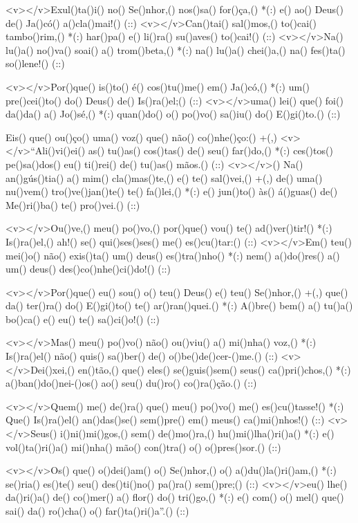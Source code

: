 <v></v>Exul()ta()i() no() Se()nhor,() nos()sa() for()ça,() *(:)
e() ao() Deus() de() Ja()có() a()cla()mai!() (::)
<v></v>Can()tai() sal()mos,() to()cai() tambo()rim,() *(:)
har()pa() e() li()ra() su()aves() to()cai!() (::)
<v></v>Na() lu()a() no()va() soai() a() trom()beta,() *(:)
na() lu()a() chei()a,() na() fes()ta() so()lene!() (::)

<v></v>Por()que() is()to() é() cos()tu()me() em() Ja()có,() *(:)
um() pre()cei()to() do() Deus() de() Is()ra()el;() (::)
<v></v>uma() lei() que() foi() da()da() a() Jo()sé,() *(:)
quan()do() o() po()vo() sa()iu() do() E()gi()to.() (::)

Eis() que() ou()ço() uma() voz() que() não() co()nhe()ço:() +(,)
<v></v>``Ali()vi()ei() as() tu()as() cos()tas() de() seu() far()do,() *(:)
ces()tos() pe()sa()dos() eu() ti()rei() de() tu()as() mãos.() (::)
<v></v>() Na() an()gús()tia() a() mim() cla()mas()te,() e() te() sal()vei,() +(,)
de() uma() nu()vem() tro()ve()jan()te() te() fa()lei,() *(:)
e() jun()to() às() á()guas() de() Me()ri()ba() te() pro()vei.() (::)

<v></v>Ou()ve,() meu() po()vo,() por()que() vou() te() ad()ver()tir!() *(:)
Is()ra()el,() ah!() se() qui()ses()ses() me() es()cu()tar:() (::)
<v></v>Em() teu() mei()o() não() exis()ta() um() deus() es()tra()nho() *(:)
nem() a()do()res() a() um() deus() des()co()nhe()ci()do!() (::)

<v></v>Por()que() eu() sou() o() teu() Deus() e() teu() Se()nhor,() +(,)
que() da() ter()ra() do() E()gi()to() te() ar()ran()quei.() *(:)
A()bre() bem() a() tu()a() bo()ca() e() eu() te() sa()ci()o!() (::)

<v></v>Mas() meu() po()vo() não() ou()viu() a() mi()nha() voz,() *(:)
Is()ra()el() não() quis() sa()ber() de() o()be()de()cer-()me.() (::)
<v></v>Dei()xei,() en()tão,() que() eles() se()guis()sem() seus() ca()pri()chos,() *(:)
a()ban()do()nei-()os() ao() seu() du()ro() co()ra()ção.() (::)

<v></v>Quem() me() de()ra() que() meu() po()vo() me() es()cu()tasse!() *(:)
Que() Is()ra()el() an()das()se() sem()pre() em() meus() ca()mi()nhos!() (::)
<v></v>Seus() i()ni()mi()gos,() sem() de()mo()ra,() hu()mi()lha()ri()a() *(:)
e() vol()ta()ri()a() mi()nha() mão() con()tra() o() o()pres()sor.() (::)

<v></v>Os() que() o()dei()am() o() Se()nhor,() o() a()du()la()ri()am,() *(:)
se()ria() es()te() seu() des()ti()no() pa()ra() sem()pre;() (::)
<v></v>eu() lhe() da()ri()a() de() co()mer() a() flor() do() tri()go,() *(:)
e() com() o() mel() que() sai() da() ro()cha() o() far()ta()ri()a''.() (::)